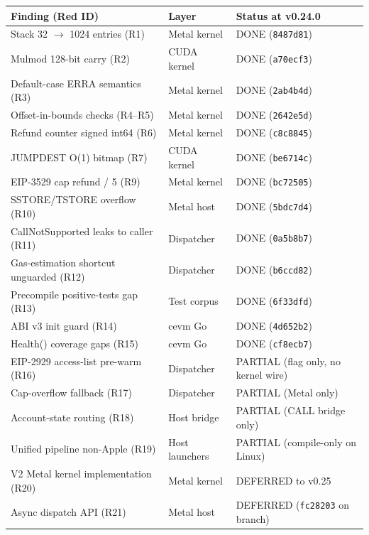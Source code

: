 \begin{table}[h]
\centering
\small
\begin{tabular}{lll}
\toprule
\textbf{Finding (Red ID)} & \textbf{Layer} & \textbf{Status at v0.24.0} \\
\midrule
Stack 32 $\to$ 1024 entries (R1)        & Metal kernel    & DONE (\texttt{8487d81}) \\
Mulmod 128-bit carry (R2)               & CUDA kernel     & DONE (\texttt{a70ecf3}) \\
Default-case ERRA semantics (R3)        & Metal kernel    & DONE (\texttt{2ab4b4d}) \\
Offset-in-bounds checks (R4--R5)        & Metal kernel    & DONE (\texttt{2642e5d}) \\
Refund counter signed int64 (R6)        & Metal kernel    & DONE (\texttt{c8c8845}) \\
JUMPDEST O(1) bitmap (R7)               & CUDA kernel     & DONE (\texttt{be6714c}) \\
EIP-3529 cap refund / 5 (R9)            & Metal kernel    & DONE (\texttt{bc72505}) \\
SSTORE/TSTORE overflow (R10)            & Metal host      & DONE (\texttt{5bdc7d4}) \\
\midrule
CallNotSupported leaks to caller (R11)  & Dispatcher      & DONE (\texttt{0a5b8b7}) \\
Gas-estimation shortcut unguarded (R12) & Dispatcher      & DONE (\texttt{b6ccd82}) \\
Precompile positive-tests gap (R13)     & Test corpus     & DONE (\texttt{6f33dfd}) \\
ABI v3 init guard (R14)                 & cevm Go         & DONE (\texttt{4d652b2}) \\
Health() coverage gaps (R15)            & cevm Go         & DONE (\texttt{cf8ecb7}) \\
\midrule
EIP-2929 access-list pre-warm (R16)     & Dispatcher      & PARTIAL (flag only, no kernel wire) \\
Cap-overflow fallback (R17)             & Dispatcher      & PARTIAL (Metal only) \\
Account-state routing (R18)             & Host bridge     & PARTIAL (CALL bridge only) \\
Unified pipeline non-Apple (R19)        & Host launchers  & PARTIAL (compile-only on Linux) \\
\midrule
V2 Metal kernel implementation (R20)    & Metal kernel    & DEFERRED to v0.25 \\
Async dispatch API (R21)                & Metal host      & DEFERRED (\texttt{fc28203} on branch) \\

\end{tabular}
\end{table}
